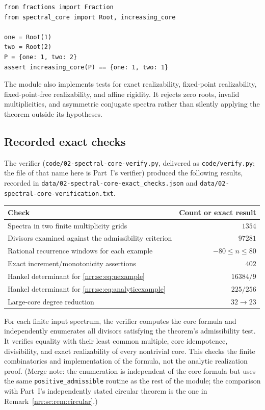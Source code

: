 \documentclass[11pt,letterpaper]{article}
\theoremstyle{definition}
\theoremstyle{remark}
\begin{document}
\begin{lstlisting}
from fractions import Fraction
from spectral_core import Root, increasing_core

one = Root(1)
two = Root(2)
P = {one: 1, two: 2}
assert increasing_core(P) == {one: 1, two: 1}
\end{lstlisting}

The module also implements tests for exact realizability, fixed-point
realizability, fixed-point-free realizability, and affine rigidity.
It rejects zero roots, invalid multiplicities, and asymmetric conjugate
spectra rather than silently applying the theorem outside its hypotheses.

\subsection{Recorded exact checks}

The verifier (\nolinkurl{code/02-spectral-core-verify.py}, delivered as
\texttt{code/verify.py}; the file of that name here is Part~I's verifier)
produced the following results, recorded in
\nolinkurl{data/02-spectral-core-exact_checks.json} and
\nolinkurl{data/02-spectral-core-verification.txt}.
\begin{center}
\begin{tabularx}{\linewidth}{@{}Xr@{}}
\toprule
Check & Count or exact result\\
\midrule
Spectra in two finite multiplicity grids & $1354$\\
Divisors examined against the admissibility criterion & $97281$\\
Rational recurrence windows for each example & $-80\le n\le80$\\
Exact increment/monotonicity assertions & $402$\\
Hankel determinant for \eqref{nrr:sc:eq:uexample} & $16384/9$\\
Hankel determinant for \eqref{nrr:sc:eq:analyticexample} & $225/256$\\
Large-core degree reduction & $32\to23$\\
\bottomrule
\end{tabularx}
\end{center}

For each finite input spectrum, the verifier computes the core formula
and independently enumerates all divisors satisfying the theorem's
admissibility test. It verifies equality with their least common multiple,
core idempotence, divisibility, and exact realizability of every nontrivial
core. This checks the finite combinatorics and implementation of the
formula, not the analytic realization proof. (Merge note: the enumeration is
independent of the core formula but uses the same
\texttt{positive\_admissible} routine as the rest of the module; the
comparison with Part~I's independently stated circular theorem is the one in
Remark~\ref{nrr:sc:rem:circular}.)
\end{document}
